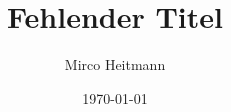 \providecommand{\sTitle}{Fehlender Titel}
\providecommand{\sAuthor}{Mirco Heitmann}
\providecommand{\sInstitute}{THM}
\providecommand{\sDate}{\today}

\usepackage[T1]{fontenc}
\usepackage[ngerman]{babel}
\usepackage[utf8]{inputenc}
\usepackage{amsmath}
\usepackage{tabularray}
\usepackage{xcolor}
\usepackage{multirow}
\usepackage{graphicx}
\usepackage{xurl}
\usepackage{standalone}

\graphicspath{ {./img/} }

\newcommand{\smallsource}[1]{{\fontsize{6pt}{6pt}\fontshape{n}\fontseries{m}\selectfont \textit{Quelle: \href{#1}{#1}}}}
\newcommand{\smallersource}[1]{{\fontsize{6pt}{6pt}\fontshape{n}\fontseries{m}\selectfont \href{#1}{#1}}}
\providecommand{\framesourcesname}{Quellen}
\newcommand{\framesources}[1]{
\section{\framesourcesname}
\begin{frame}
\frametitle{\framesourcesname}
\begin{itemize}
#1
\end{itemize}
\end{frame}
}
\newcommand{\todo}[1]{{\color{red}#1}}
\newcommand{\graphicsfig}[4]{
\begin{figure}[H]
\centering
\texttt{[image: \#1]}
\caption{#2} \label{#3}
\end{figure}
}

\title{\sTitle}
\author{\sAuthor}
\institute{\sInstitute}
\date{\sDate}

\usepackage{letltxmacro}
\makeatletter
\let\oldr@@t\r@@t
\def\r@@t#1#2{%
\setbox0=\hbox{$\oldr@@t#1{#2\,}$}\dimen0=\ht0
\advance\dimen0-0.2\ht0
\setbox2=\hbox{\vrule height\ht0 depth -\dimen0}%
{\box0\lower0.4pt\box2}}
\LetLtxMacro{\oldsqrt}{\sqrt}
\renewcommand*{\sqrt}[2][\ ]{\oldsqrt[#1]{#2}}
\makeatother
